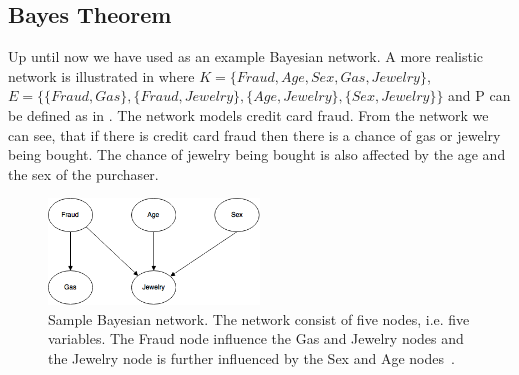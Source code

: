 \subsection{Bayes Theorem}

Up until now we have used  as an example Bayesian network. A more realistic network is illustrated in  where $K = \{Fraud, Age, Sex, Gas, Jewelry\}$, $E = \{\{Fraud, Gas\}, \{Fraud, Jewelry\}, \{Age, Jewelry\}, \{Sex, Jewelry\}\}$ and P can be defined as in . The network models credit card fraud. From the network we can see, that if there is credit card fraud then there is a chance of gas or jewelry being bought. The chance of jewelry being bought is also affected by the age and the sex of the purchaser.

\begin{figure}[h!]
\centering
\includegraphics[width=0.5\textwidth]{images/sample_bayesian_network}
\caption{Sample Bayesian network. The network consist of five nodes, i.e. five variables. The Fraud node influence the Gas and Jewelry nodes and the Jewelry node is further influenced by the Sex and Age nodes~\cite{stephenson2000introduction}.}
\label{fig:analysis:bayesian-network:sample}
\end{figure}

